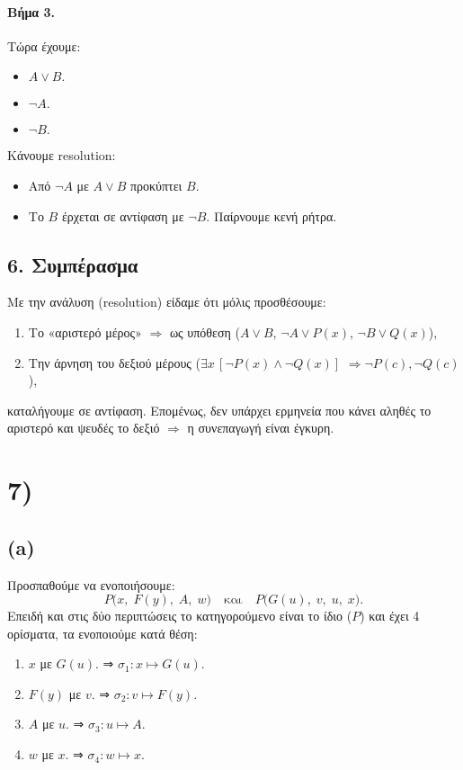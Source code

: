 \documentclass[a4paper,12pt]{article}
\begin{document}
\paragraph{Βήμα 3.}
Τώρα έχουμε:
\begin{itemize}
    \item $A \lor B.$
    \item $\neg A.$
    \item $\neg B.$
\end{itemize}
Κάνουμε resolution:
\begin{itemize}
    \item Από $\neg A$ με $A \lor B$ προκύπτει $B$.
    \item Το $B$ έρχεται σε αντίφαση με $\neg B$. Παίρνουμε κενή ρήτρα.
\end{itemize}

\subsection*{6. Συμπέρασμα}
Με την ανάλυση (resolution) είδαμε ότι μόλις προσθέσουμε:
\begin{enumerate}
    \item Το «αριστερό μέρος» $\Rightarrow$ ως υπόθεση ($A \lor B$, $\neg A \lor P(x)$, $\neg B \lor Q(x)$),
    \item Την άρνηση του δεξιού μέρους ($\exists x\,[\neg P(x) \land \neg Q(x)]$ \(\Rightarrow \neg P(c), \neg Q(c)\)),
\end{enumerate}
καταλήγουμε σε αντίφαση. Επομένως, δεν υπάρχει ερμηνεία που κάνει αληθές το αριστερό και ψευδές το δεξιό \(\Rightarrow\) η συνεπαγωγή είναι έγκυρη.

\section*{7)}

\subsection*{(a)}
Προσπαθούμε να ενοποιήσουμε: 
\[
P\bigl(x,\;F(y),\;A,\;w\bigr)\quad\text{και}\quad P\bigl(G(u),\;v,\;u,\;x\bigr).
\]
Επειδή και στις δύο περιπτώσεις το κατηγορούμενο είναι το ίδιο ($P$) και έχει 4 ορίσματα, τα ενοποιούμε κατά θέση:
\begin{enumerate}
    \item $x$ με $G(u)$. ⇒ $\sigma_1: x \mapsto G(u)$.
    \item $F(y)$ με $v$. ⇒ $\sigma_2: v \mapsto F(y)$.
    \item $A$ με $u$. ⇒ $\sigma_3: u \mapsto A$.
    \item $w$ με $x$. ⇒ $\sigma_4: w \mapsto x$.
\end{enumerate}
\end{document}
